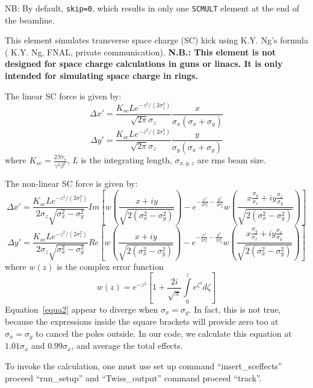 NB: By default, \verb|skip=0|, which results in only one \verb|SCMULT| element at the
end of the beamline.

This element simulates transverse space charge (SC) kick using
K.Y. Ng's formula ( K.Y. Ng, FNAL, private communication). 
{\bf N.B.: This element is not designed for space charge
calculations in guns or linacs.  It is only intended for
simulating space charge in rings. }

The linear SC force is given by:
\[
\Delta x'=\frac{K_{sc}Le^{-z^2/(2\sigma_z^2)}}{\sqrt{2\pi}\sigma_z}
\frac{x}{\sigma_x(\sigma_x+\sigma_y)}
\]
\begin{equation}
\Delta y'=\frac{K_{sc}Le^{-z^2/(2\sigma_z^2)}}{\sqrt{2\pi}\sigma_z}
\frac{y}{\sigma_y(\sigma_x+\sigma_y)}
\end{equation}
where $K_{sc}=\frac{2Nr_e}{\gamma^3\beta^2}$,
$L$ is the integrating length, $\sigma_{x,y,z}$ are rms beam size.

The non-linear SC force is given by:
\[
\Delta x'=\frac{K_{sc}Le^{-z^2/(2\sigma_z^2)}}{2\sigma_z\sqrt{\sigma_x^2-\sigma_y^2}}
Im\left [ w\left( \frac{x+iy}{\sqrt{2(\sigma_x^2-\sigma_y^2)}} \right)
-e^{-\frac{x^2}{2 \sigma_x^2}-\frac{y^2}{2 \sigma_y^2}}
w\left(\frac{x\frac{\sigma_y}{\sigma_x}+iy\frac{\sigma_x}{\sigma_y}}
{\sqrt{2(\sigma_x^2-\sigma_y^2)}}\right)\right ]
\]
\begin{equation}
\Delta y'=\frac{K_{sc}Le^{-z^2/(2\sigma_z^2)}}{2\sigma_z\sqrt{\sigma_x^2-\sigma_y^2}}
Re\left [ w\left( \frac{x+iy}{\sqrt{2(\sigma_x^2-\sigma_y^2)}} \right)
-e^{-\frac{x^2}{2 \sigma_x^2}-\frac{y^2}{2 \sigma_y^2}}
w\left(\frac{x\frac{\sigma_y}{\sigma_x}+iy\frac{\sigma_x}{\sigma_y}}
{\sqrt{2(\sigma_x^2-\sigma_y^2)}}\right)\right ]
\label{equa2}
\end{equation}
where $w(z)$ is the complex error function
\begin{equation}
w(z)=e^{-z^2}\left [ 1+\frac{2i}{\sqrt{\pi}}\int\limits_0^z e^{\zeta^2}d\zeta\right ]
\end{equation}
Equation~\ref{equa2} appear to diverge when $\sigma_x=\sigma_y$. In fact, this is not
true, because the expressions inside the square brackets will provide zero too at
$\sigma_x=\sigma_y$ to cancel the poles outside. In our code, we calculate this equation
at  $1.01 \sigma_x$ and $0.99\sigma_x$, and average the total effects. 
 
To invoke the calculation, one must use set up command
``insert\_sceffects'' proceed ``run\_setup'' and ``Twiss\_output''
command proceed ``track''.

